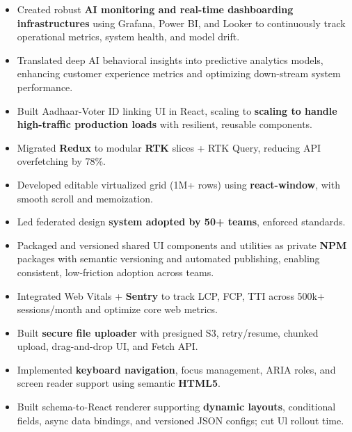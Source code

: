 \documentclass[100pt,a4paper]{article}
\begin{document}
\begin{itemize}
\item {Created robust \textbf{AI monitoring and real-time dashboarding infrastructures} using Grafana, Power BI, and Looker to continuously track operational metrics, system health, and model drift.}
\item {Translated deep AI behavioral insights into predictive analytics models, enhancing customer experience metrics and optimizing down-stream system performance.}
\item {Built Aadhaar-Voter ID linking UI in React, scaling to \textbf{scaling to handle high-traffic production loads} with resilient, reusable components.}
\item {Migrated \textbf{Redux} to modular \textbf{RTK} slices + RTK Query, reducing API overfetching by 78\%.}
\item {Developed editable virtualized grid (1M+ rows) using \textbf{react-window}, with smooth scroll and memoization.}
\item {Led federated design \textbf{system adopted by 50+ teams}, enforced standards.}
\item {Packaged and versioned shared UI components and utilities as private \textbf{NPM} packages with semantic versioning and automated publishing, enabling consistent, low-friction adoption across teams.}
\item {Integrated Web Vitals + \textbf{Sentry} to track LCP, FCP, TTI across 500k+ sessions/month and optimize core web metrics.}
\item {Built \textbf{secure file uploader} with presigned S3, retry/resume, chunked upload, drag-and-drop UI, and Fetch API.}
\item {Implemented \textbf{keyboard navigation}, focus management, ARIA roles, and screen reader support using semantic \textbf{HTML5}.}
\item {Built schema-to-React renderer supporting \textbf{dynamic layouts}, conditional fields, async data bindings, and versioned JSON configs; cut Ul rollout time.}
\end{itemize}
\end{document}
